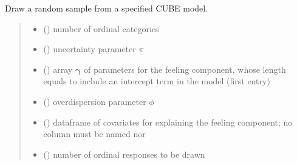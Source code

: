\documentclass[letterpaper,10pt,english]{sphinxmanual}
\begin{document}

\begin{fulllineitems}
\label{\detokenize{cubmods:cubmods.cube_0w0.draw}}
\pysigstartsignatures
{}
\pysigstopsignatures
\sphinxAtStartPar
Draw a random sample from a specified CUBE model.
\begin{quote}\begin{description}
\begin{itemize}
\item {} 
\sphinxAtStartPar
{} () \textendash{} number of ordinal categories

\item {} 
\sphinxAtStartPar
{} () \textendash{} uncertainty parameter \(\pi\)

\item {} 
\sphinxAtStartPar
{} () \textendash{} array \(\pmb \gamma\) of parameters for the feeling component, whose length equals 
 to include an intercept term in the model (first entry)

\item {} 
\sphinxAtStartPar
{} () \textendash{} overdispersion parameter \(\phi\)

\item {} 
\sphinxAtStartPar
{} () \textendash{} dataframe of covariates for explaining the feeling component;
no column must be named  nor 

\item {} 
\sphinxAtStartPar
{} () \textendash{} number of ordinal responses to be drawn


\end{itemize}
\end{description}
\end{quote}
\end{fulllineitems}
\end{document}
